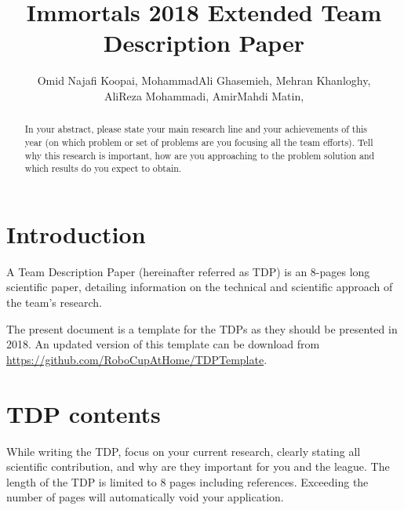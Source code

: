 \documentclass[runningheads,a4paper]{llncs}
\title{Immortals 2018 Extended Team Description Paper}
\author{\normalsize Omid Najafi Koopai{\small\textsupsub{1}{}}, 
MohammadAli Ghasemieh{\small\textsupsub{2}{}}, 
Mehran Khanloghy{\small\textsupsub{3}{}}, \\
\normalsize AliReza Mohammadi{\small\textsupsub{3}{}}, 
AmirMahdi Matin{\small\textsupsub{3}{}}, 
}
\institute{Sharif University of Technology, \\
\texttt{http://devoted-web-site.url}}
\begin{document}
\maketitle


%
%

\begin{abstract}

In your abstract, please state your main research line and your achievements of this year (on which problem or set of problems are you focusing all the team efforts). Tell why this research is important, how are you approaching to the problem solution and which results do you expect to obtain.

\end{abstract}



\section{Introduction}
A Team Description Paper (hereinafter referred as TDP) is an 8-pages long scientific paper, detailing information on the technical and scientific approach of the team's research.

The present document is a template for the TDPs as they should be presented in 2018. An updated version of this template can be download from \\\url{https://github.com/RoboCupAtHome/TDPTemplate}.


\section{TDP contents}
While writing the TDP, focus on your current research, clearly stating all scientific contribution, and why are they important for you and the league. The length of the TDP is limited to 8 pages including references. Exceeding the number of pages will automatically void your application.
\end{document}
